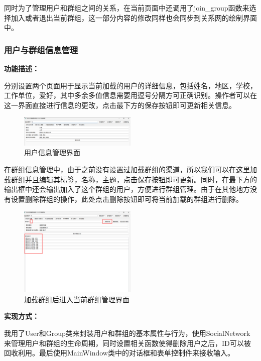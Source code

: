 \documentclass[12pt,a4paper]{article}
\begin{document}
同时为了管理用户和群组之间的关系，在当前页面中还调用了join\_group函数来选择加入或者退出当前群组，这一部分内容的修改同样也会同步到关系网的绘制界面中。

\subsubsection{用户与群组信息管理}

\noindent\textbf{功能描述：}

分别设置两个页面用于显示当前加载的用户的详细信息，包括姓名，地区，学校，工作单位，爱好，其中多余多值信息需要用逗号分隔方可正确识别。操作者可以在这一界面直接进行信息的更改，点击最下方的保存按钮即可更新相关信息。

\begin{figure}[H]
    \centering
    \includegraphics[width=0.5\textwidth]{pt2-5.png}
    \caption{用户信息管理界面}
\end{figure}

在群组信息管理中，由于之前没有设置过加载群组的渠道，所以我们可以在这里加载群组并且编辑其标签，名称，主题，点击保存按钮即可更新。同时，在最下方的输出框中还会输出加入了这个群组的用户，方便进行群组管理。由于在其他地方没有设置删除群组的操作，此处点击删除按钮即可将当前加载的群组进行删除。

\begin{figure}[H]
    \centering
    \includegraphics[width=0.5\textwidth]{pt2-6.png}
    \caption{加载群组后进入当前群组管理界面}
\end{figure}

\noindent\textbf{实现方式：}

我用了User和Group类来封装用户和群组的基本属性与行为，使用SocialNetwork来管理用户和群组的生命周期，同时设置相关函数使得删除用户之后，ID可以被回收利用。最后使用MainWindow类中的对话框和表单控制件来接收输入。
\end{document}
